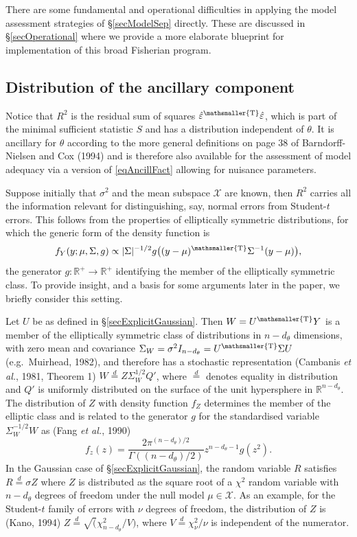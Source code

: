 \documentclass[10pt, reqno]{amsart}
\numberwithin{equation}{section}
\newcommand{\RR}{\mathbb{R}}
\newcommand{\T}{{\mathsmaller {\rm T}}}
\begin{document}
There are some fundamental and operational difficulties in applying the model assessment strategies of \S \ref{secModelSep} directly. These are discussed in \S \ref{secOperational} where we provide a more elaborate blueprint for implementation of this broad Fisherian program.

\subsection{Distribution of the ancillary component}\label{secElliptic}

Notice that $R^2$ is the residual sum of squares $\hat\varepsilon^\T \hat\varepsilon$, which is part of the minimal sufficient statistic $S$ and has a distribution independent of $\theta$. It is ancillary for $\theta$ according to the more general definitions on page 38 of Barndorff-Nielsen and Cox (1994) and is therefore also available for the assessment of model adequacy via a version of \eqref{eqAncillFact} allowing for nuisance parameters.


Suppose initially that $\sigma^2$ and the mean subspace $\mathcal{X}$ are known, then $R^2$ carries all the information relevant for distinguishing, say, normal errors from Student-$t$ errors. This follows from the properties of elliptically symmetric distributions, for which the generic form of the density function is 
\[
f_Y(y;\mu, \Sigma, g) \propto |\Sigma|^{-1/2}g\bigl((y-\mu)^\T \Sigma^{-1}(y-\mu) \bigr),
\]
the generator $g:\RR^+ \rightarrow \RR^+$ identifying the member of the elliptically symmetric class. To provide insight, and a basis for some arguments later in the paper, we briefly consider this setting.

Let $U$ be as defined in \S \ref{secExplicitGaussian}. Then $W=U^\T Y$ is a member of the elliptically symmetric class of distributions in $n-d_\theta$ dimensions, with zero mean and covariance $\Sigma_W=\sigma^2 I_{n-d_\theta} = U^\T \Sigma U$ (e.g.~Muirhead, 1982), and therefore has a stochastic representation (Cambanis \emph{et al.}, 1981, Theorem 1) $W\stackrel{d}{=}Z\Sigma_W^{1/2} Q'$, where $\stackrel{d}{=}$ denotes equality in distribution and $Q'$ is uniformly distributed on the surface of the unit hypersphere in $\RR^{n-d_\theta}$. The distribution of $Z$ with density function $f_Z$ determines the member of the elliptic class and is related to the generator $g$ for the standardised variable $\Sigma^{-1/2}_W W$ as (Fang \emph{et al.}, 1990)
\[
f_z(z) =\frac{2 \pi^{(n-d_\theta)/2}}{\Gamma((n-d_\theta)/2)}z^{n-d_\theta-1}g(z^2). 
\]
In the Gaussian case of \S \ref{secExplicitGaussian}, the random variable $R$ satisfies $R\stackrel{d}{=}\sigma Z$ where $Z$ is distributed as the square root of a $\chi^2$ random variable with $n-d_\theta$ degrees of freedom under the null model $\mu\in \mathcal{X}$. As an example, for the Student-$t$ family of errors with $\nu$ degrees of freedom, the distribution of $Z$ is (Kano, 1994) $Z\stackrel{d}{=}\surd(\chi^2_{n-d_\theta}/V)$, where $V\stackrel{d}{=}\chi^2_{\nu}/\nu$ is independent of the numerator.
\end{document}
